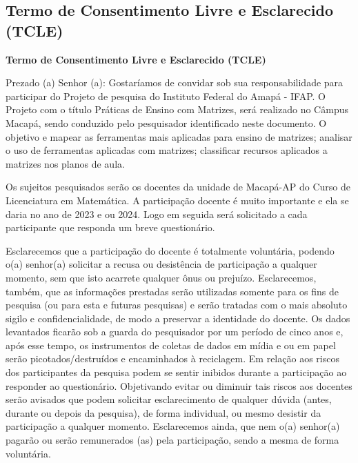 
\begin{apendicesenv}
\partapendices  %
\chapter{Termo de Consentimento Livre e Esclarecido (TCLE)}

\begin{center}
\textbf{Termo de Consentimento Livre e Esclarecido (TCLE)}
\end{center}


Prezado (a) Senhor (a):
Gostaríamos de convidar sob sua responsabilidade para participar do Projeto de pesquisa do Instituto Federal do Amapá - IFAP. O Projeto com o título Práticas de Ensino com Matrizes, será realizado no Câmpus Macapá, sendo conduzido pelo pesquisador identificado neste documento. O objetivo e mapear as ferramentas mais aplicadas para ensino de matrizes; analisar o uso de ferramentas aplicadas com matrizes; classificar recursos aplicados a matrizes nos planos de aula.

Os sujeitos pesquisados serão os docentes da unidade de Macapá-AP
do Curso de Licenciatura em Matemática. A participação docente é muito importante e ela se daria no ano de 2023 e ou 2024.
Logo em seguida será solicitado a cada participante que responda um breve questionário.

Esclarecemos que a participação do docente é totalmente voluntária, podendo o(a) senhor(a) solicitar a recusa ou desistência de participação a qualquer
momento, sem que isto acarrete qualquer ônus ou prejuízo. Esclarecemos,
também, que as informações prestadas serão utilizadas somente para os fins de pesquisa (ou para esta e futuras pesquisas) e serão tratadas com o mais absoluto sigilo e confidencialidade, de modo a preservar a identidade do docente. Os dados levantados ficarão sob a guarda do pesquisador por um período de cinco anos e, após esse tempo, os instrumentos de coletas de dados em mídia e ou em papel serão picotados/destruídos e encaminhados à reciclagem. Em relação aos riscos dos participantes da pesquisa podem se sentir inibidos durante a participação ao responder ao questionário. Objetivando evitar ou diminuir tais riscos aos docentes serão avisados que podem solicitar esclarecimento de qualquer dúvida (antes, durante ou depois da pesquisa), de forma individual, ou mesmo desistir da participação a qualquer momento. Esclarecemos ainda, que nem o(a) senhor(a) pagarão ou serão remunerados (as) pela participação, sendo a mesma de forma voluntária.




\end{apendicesenv}
